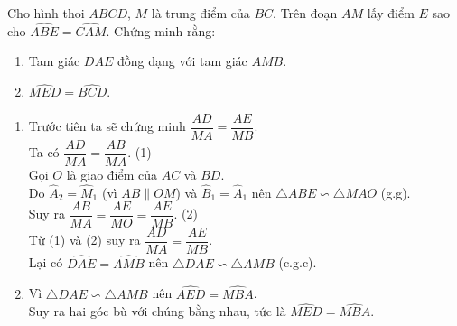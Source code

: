 \begin{bt}%
 Cho hình thoi $ABCD$, $M$ là trung điểm của $BC$. Trên đoạn $AM$ lấy điểm $E$ sao cho $\widehat{ABE} = \widehat{CAM}$. Chứng minh rằng:
 \begin{enumerate}
  \item Tam giác $DAE$ đồng dạng với tam giác $AMB$.
  \item $\widehat{MED} = \widehat{BCD}$.
 \end{enumerate}
 \loigiai
  {
  \immini
  {
  \begin{enumerate}
   \item Trước tiên ta sẽ chứng minh $\dfrac{AD}{MA} = \dfrac{AE}{MB}$.\\
   Ta có $\dfrac{AD}{MA} = \dfrac{AB}{MA}$. \hfill (1)\\
   Gọi $O$ là giao điểm của $AC$ và $BD$.\\
   Do $\widehat{A}_2 = \widehat{M}_1$ (vì $AB \parallel OM$) và $\widehat{B}_1 = \widehat{A}_1$ nên $\triangle ABE \backsim \triangle MAO$ (g.g).\\
   Suy ra $\dfrac{AB}{MA} = \dfrac{AE}{MO} = \dfrac{AE}{MB}$. \hfill (2)\\
   Từ (1) và (2) suy ra $\dfrac{AD}{MA} = \dfrac{AE}{MB}$.\\
   Lại có $\widehat{DAE} = \widehat{AMB}$ nên $\triangle DAE \backsim \triangle AMB$ (c.g.c).
   \item Vì $\triangle DAE \backsim \triangle AMB$ nên $\widehat{AED} = \widehat{MBA}$.\\
   Suy ra hai góc bù với chúng bằng nhau, tức là $\widehat{MED} = \widehat{MBA}$.
  \end{enumerate}
  }
  {
  }
  }
\end{bt}


